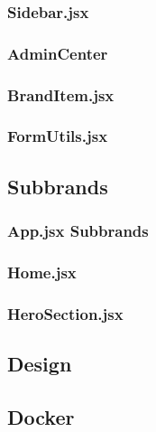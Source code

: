 \subsubsection{Sidebar.jsx} \label{sidebar}

\subsubsection{AdminCenter} \label{admincenter}

\subsubsection{BrandItem.jsx} \label{branditem}

\subsubsection{FormUtils.jsx} \label{formutils}


\subsection{Subbrands} \label{subbrands}

\subsubsection{App.jsx Subbrands} \label{appSubbrands}

\subsubsection{Home.jsx} \label{home}

\subsubsection{HeroSection.jsx} \label{herosection}


\subsection{Design} \label{styling}

\subsection{Docker} \label{dockermain}
